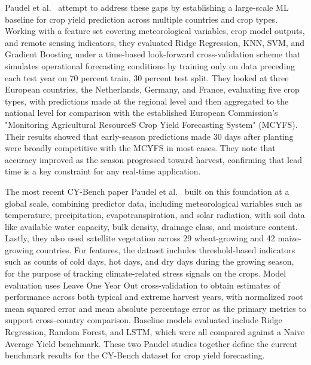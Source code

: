 \documentclass[pdflatex,sn-mathphys-num, oneside]{sn-jnl}%
\theoremstyle{thmstyleone}%
\theoremstyle{thmstyletwo}%
\theoremstyle{thmstylethree}%
\begin{document}
Paudel et al.~\cite{bib16} attempt to address these gaps by establishing a large-scale ML baseline for crop yield prediction across multiple countries and crop types. Working with a feature set covering meteorological variables, crop model outputs, and remote sensing indicators, they evaluated Ridge Regression, KNN, SVM, and Gradient Boosting under a time-based look-forward cross-validation scheme that simulates operational forecasting conditions by training only on data preceding each test year on 70 percent train, 30 percent test split. They looked at three European countries, the Netherlands, Germany, and France, evaluating five crop types, with predictions made at the regional level and then aggregated to the national level for comparison with the established European Commission’s "Monitoring Agricultural ResourceS Crop Yield Forecasting System" (MCYFS). Their results showed that early-season predictions made 30 days after planting were broadly competitive with the MCYFS in most cases. They note that accuracy improved as the season progressed toward harvest, confirming that lead time is a key constraint for any real-time application.
 
The most recent CY-Bench paper Paudel et al.~\cite{bib17} built on this foundation at a global scale, combining predictor data, including meteorological variables such as temperature, precipitation, evapotranspiration, and solar radiation, with soil data like available water capacity, bulk density, drainage class, and moisture content. Lastly, they also used satellite vegetation across 29 wheat-growing and 42 maize-growing countries. For features, the dataset includes threshold-based indicators such as counts of cold days, hot days, and dry days during the growing season, for the purpose of tracking climate-related stress signals on the crops. Model evaluation uses Leave One Year Out cross-validation to obtain estimates of performance across both typical and extreme harvest years, with normalized root mean squared error and mean absolute percentage error as the primary metrics to support cross-country comparison. Baseline models evaluated include Ridge Regression, Random Forest, and LSTM, which were all compared against a Naive Average Yield benchmark. These two Paudel studies together define the current benchmark results for the CY-Bench dataset for crop yield forecasting.
 
\end{document}
